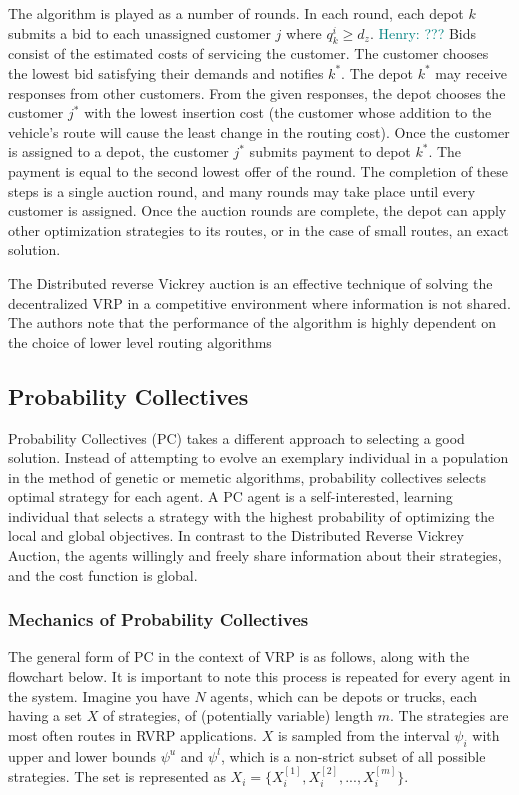 \documentclass{sig-alternate}
\newcommand{\allcomments}[1]{{#1}}
\newcommand{\hfcomment}[1]{\textcolor{Teal}{\allcomments{Henry: {#1}}}}
\begin{document}
The algorithm is played as a number of rounds. In each round, each depot $k$ submits a bid to each unassigned customer $j$ where $q_k^i \geq d_z$. \hfcomment{???} Bids consist of the estimated costs of servicing the customer. The customer chooses the lowest bid satisfying their demands and notifies $k^*$. The depot $k^*$ may receive responses from other customers. From the given responses, the depot chooses the customer $j^*$ with the lowest insertion cost (the customer whose addition to  the vehicle's route will cause the least change  in the routing cost). Once the customer is assigned to a depot, the customer $j^*$ submits payment to depot $k^*$. The payment is equal to the second lowest offer of the round. The completion of these steps is a single auction round, and many rounds may take place until every customer is assigned. Once the auction rounds are complete, the depot can apply other optimization strategies to its routes, or in the case of small routes, an exact solution.

The Distributed reverse Vickrey auction is an effective technique of solving the decentralized VRP in a competitive environment where information is not shared. The authors note that the performance of the algorithm is highly dependent on the choice of lower level routing algorithms
\subsection{Probability Collectives}
\label{ssec:PC}
Probability Collectives (PC) takes a different approach to selecting a good solution. Instead of attempting to evolve an exemplary individual in a population in the method of genetic or memetic algorithms, probability collectives selects optimal strategy for each agent\cite{Kulkarni:2008}. A PC agent is a self-interested, learning individual that selects a strategy with the highest probability of optimizing the local and global objectives. In contrast to the Distributed Reverse Vickrey Auction, the agents willingly and freely share information about their strategies, and the cost function is global.

\subsubsection{Mechanics of Probability Collectives}
The general form of PC in the context of VRP is as follows, along with the flowchart below. It is important to note this process is repeated for every agent in the system. Imagine you have $N$ agents, which can be depots or trucks, each having a set $X$ of strategies, of (potentially variable) length $m$. The strategies are most often routes in RVRP applications\cite{Vasirani:2008}. $X$ is sampled from the interval $\psi_i$ with upper and lower bounds $\psi^u$ and $\psi^l$, which is a non-strict subset of all possible strategies. The set is represented as $X_i=\{X_i^{[1]}, X_i^{[2]}, ..., X_i^{[m]}\}$. 
\end{document}
